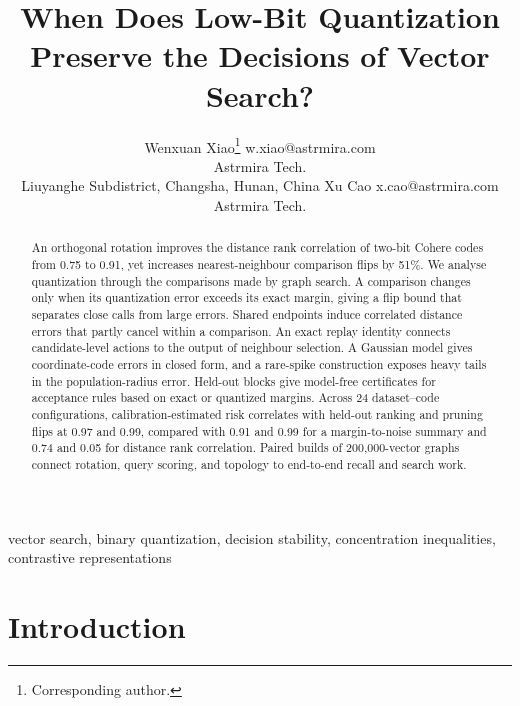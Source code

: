 \documentclass[twoside,11pt]{article}
\newif\ifarxiv
\begin{document}
\title{When Does Low-Bit Quantization Preserve the Decisions of Vector Search?}

\author{\name Wenxuan Xiao\thanks{Corresponding author.} \email w.xiao@astrmira.com \\
       \addr Astrmira Tech.\\
       Liuyanghe Subdistrict, Changsha, Hunan, China
       \AND
       \name Xu Cao \email x.cao@astrmira.com \\
       \addr Astrmira Tech.}

\ifarxiv
  \editor{}
\else
\fi

\maketitle

\begin{abstract}%
An orthogonal rotation improves the distance rank correlation of two-bit Cohere codes from 0.75 to 0.91, yet increases nearest-neighbour comparison flips by 51\%. We analyse quantization through the comparisons made by graph search. A comparison changes only when its quantization error exceeds its exact margin, giving a flip bound that separates close calls from large errors. Shared endpoints induce correlated distance errors that partly cancel within a comparison. An exact replay identity connects candidate-level actions to the output of neighbour selection. A Gaussian model gives coordinate-code errors in closed form, and a rare-spike construction exposes heavy tails in the population-radius error. Held-out blocks give model-free certificates for acceptance rules based on exact or quantized margins. Across 24 dataset--code configurations, calibration-estimated risk correlates with held-out ranking and pruning flips at 0.97 and 0.99, compared with 0.91 and 0.99 for a margin-to-noise summary and 0.74 and 0.05 for distance rank correlation. Paired builds of 200{,}000-vector graphs connect rotation, query scoring, and topology to end-to-end recall and search work.
\end{abstract}

\begin{keywords}
  vector search, binary quantization, decision stability, concentration inequalities, contrastive representations
\end{keywords}

\section{Introduction}
\label{sec:intro}
\end{document}

